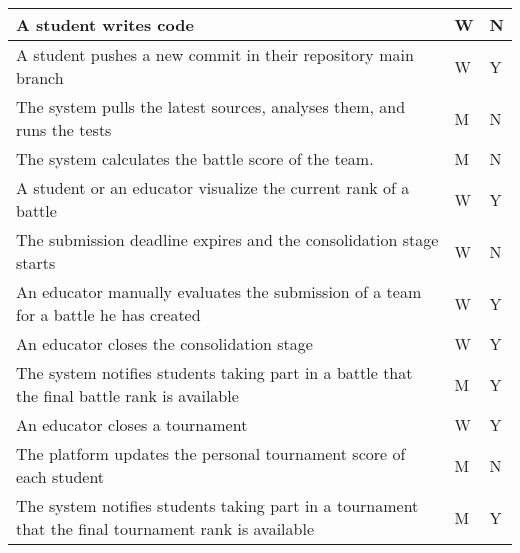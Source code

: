 \begin{center}
\begin{longtable}{|p{8.7cm}|p{3cm}|p{3cm}|}
        A student writes code                                                                                                                 & W                      & N               \\ \hline
        A student pushes a new commit in their repository main branch                                                                         & W                      & Y               \\ \hline
        The system pulls the latest sources, analyses them, and runs the tests                                                                & M                      & N               \\ \hline
        The system calculates the battle score of the team.                                                                                   & M                      & N               \\ \hline
        A student or an educator visualize the current rank of a battle                                                                       & W                      & Y               \\ \hline
        The submission deadline expires and the consolidation stage starts                                                                    & W                      & N               \\ \hline
        An educator manually evaluates the submission of a team for a battle he has created                                                   & W                      & Y               \\ \hline
        An educator closes the consolidation stage                                                                                            & W                      & Y               \\ \hline
        The system notifies students taking part in a battle that the final battle rank is available                                          & M                      & Y               \\ \hline
        An educator closes a tournament                                                                                                       & W                      & Y               \\ \hline
        The platform updates the personal tournament score of each student                                                                    & M                      & N               \\ \hline
        The system notifies students taking part in a tournament that the final tournament rank is available                                  & M                      & Y               \\ \hline

\end{longtable}
\end{center}
